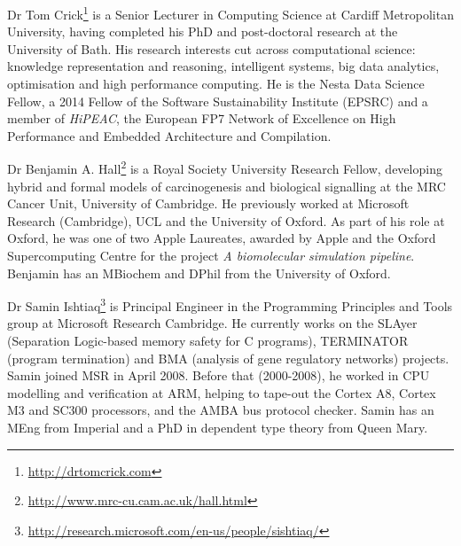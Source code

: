 \documentclass[a4paper,11pt]{article}
\begin{document}
Dr Tom Crick\footnote{\url{http://drtomcrick.com}} is a Senior Lecturer in
Computing Science at Cardiff Metropolitan University, having completed
his PhD and post-doctoral research at the University of Bath. His
research interests cut across computational science: knowledge
representation and reasoning, intelligent systems, big data analytics,
optimisation and high performance computing.  He is the Nesta Data
Science Fellow, a 2014 Fellow of the Software Sustainability Institute
(EPSRC) and a member of {\emph{HiPEAC}}, the European FP7 Network of
Excellence on High Performance and Embedded Architecture and
Compilation.

Dr Benjamin A. Hall\footnote{\url{http://www.mrc-cu.cam.ac.uk/hall.html}}
is a Royal Society University Research Fellow, developing hybrid and
formal models of carcinogenesis and biological signalling at the MRC
Cancer Unit, University of Cambridge. He previously worked at
Microsoft Research (Cambridge), UCL and the University of Oxford. As
part of his role at Oxford, he was one of two Apple
Laureates, awarded by Apple and the Oxford Supercomputing Centre for
the project {\emph{A biomolecular simulation pipeline}}. Benjamin has an
MBiochem and DPhil from the University of Oxford.

Dr Samin
Ishtiaq\footnote{\url{http://research.microsoft.com/en-us/people/sishtiaq/}}
is Principal Engineer in the Programming Principles and Tools group at
Microsoft Research Cambridge. He currently works on the SLAyer
(Separation Logic-based memory safety for C programs), TERMINATOR
(program termination) and BMA (analysis of gene regulatory networks)
projects. Samin joined MSR in April 2008. Before that (2000-2008), he
worked in CPU modelling and verification at ARM, helping to tape-out
the Cortex A8, Cortex M3 and SC300 processors, and the AMBA bus
protocol checker. Samin has an MEng from Imperial and a PhD in
dependent type theory from Queen Mary.



\end{document}
